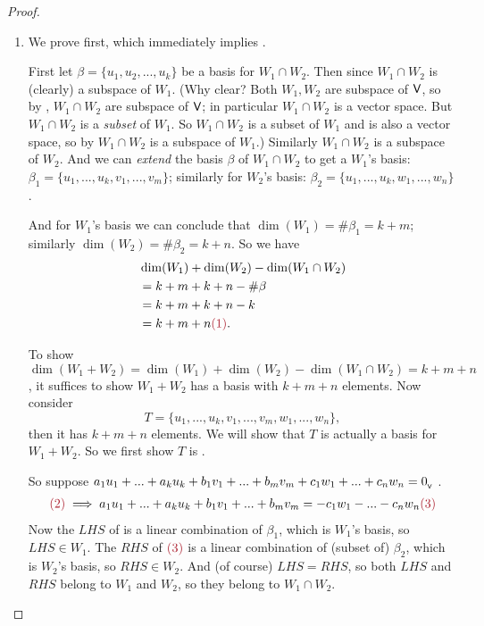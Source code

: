 \begin{proof} \ 

\begin{enumerate}
\item
We prove  first, which immediately implies .

First let \(\beta = \{ u_1, u_2, ..., u_k \}\) be a basis for \(W_1 \cap W_2\).
Then since \(W_1 \cap W_2\) is (clearly) a subspace of \(W_1\). (Why clear? Both \(W_1, W_2\) are subspace of \(\textsf{V}\), so by , \(W_1 \cap W_2\) are subspace of \(\textsf{V}\);
in particular \(W_1 \cap W_2\) is a vector space.
But \(W_1 \cap W_2\) is a \emph{subset} of \(W_1\).
So \(W_1 \cap W_2\) is a subset of \(W_1\) and is also a vector space, so by  \(W_1 \cap W_2\) is a subspace of \(W_1\).)
Similarly \(W_1 \cap W_2\) is a subspace of \(W_2\).
And  we can \emph{extend} the basis \(\beta\) of \(W_1 \cap W_2\) to get a \(W_1\)'s basis: \(\beta_1 = \{ u_1, ..., u_k, v_1, ..., v_m \}\);
similarly for \(W_2\)'s basis: \(\beta_2 = \{ u_1, ..., u_k, w_1, ..., w_n \}\).

And for \(W_1\)'s basis we can conclude that \(\dim(W_1) = \#\beta_1 = k + m\);
similarly \(\dim(W_2) = \#\beta_2 = k + n\).
So we have
\begin{align*}
    & \dim(W_1) + \dim(W_2) - \dim(W_1 \cap W_2) \\
    & = k + m + k + n - \#\beta \\
    & = k + m + k + n - k \\ 
    & = k + m + n \MAROON{(1)}.
\end{align*}

\sloppy To show \(\dim(W_1 + W_2) = \dim(W_1) + \dim(W_2) - \dim(W_1 \cap W_2) = k + m + n\), it suffices to show \(W_1 + W_2\) has a basis with \(k + m + n\) elements.
Now consider
\[
    T = \{ u_1, ..., u_k, v_1, ..., v_m, w_1, ..., w_n \},
\]
then it has \(k + m + n\) elements.
We will show that \(T\) is actually a basis for \(W_1 + W_2\).
So we first show \(T\) is \LID{}.

So suppose \(a_1 u_1 + ... + a_k u_k + b_1 v_1 + ... + b_m v_m + c_1 w_1 + ... + c_n w_n = 0_{_{\textsf{V}}}\) .
\begin{align*}
    \MAROON{(2)} \implies a_1 u_1 + ... + a_k u_k + b_1 v_1 + ... + b_m v_m = - c_1 w_1 - ... - c_n w_n \MAROON{(3)}
\end{align*}
Now the \(LHS\) of  is a linear combination of \(\beta_1\), which is \(W_1\)'s basis, so \(LHS \in W_1\).
The \(RHS\) of \(\MAROON{(3)}\) is a linear combination of (subset of) \(\beta_2\), which is \(W_2\)'s basis, so \(RHS \in W_2\).
And (of course) \(LHS = RHS\), so both \(LHS\) and \(RHS\) belong to \(W_1\) and \(W_2\), so they belong to \(W_1 \cap W_2\).


\end{enumerate}
\end{proof}

